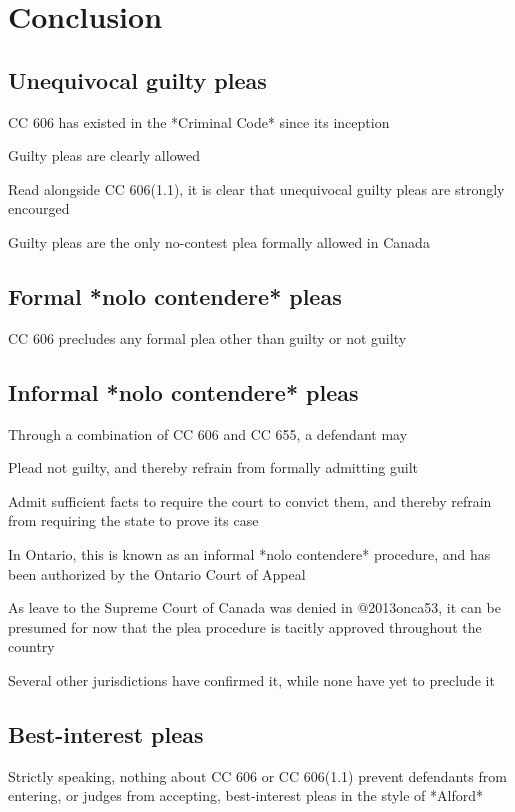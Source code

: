 \section{Conclusion}

\subsection{Unequivocal guilty pleas}

CC 606 has existed in the *Criminal Code* since its inception

Guilty pleas are clearly allowed

Read alongside CC 606(1.1), it is clear that unequivocal guilty pleas are strongly encourged

Guilty pleas are the only no-contest plea formally allowed in Canada

\subsection{Formal *nolo contendere* pleas}

CC 606 precludes any formal plea other than guilty or not guilty

\subsection{Informal *nolo contendere* pleas}
Through a combination of CC 606 and CC 655, a defendant may

Plead not guilty, and thereby refrain from formally admitting guilt

Admit sufficient facts to require the court to convict them, and thereby refrain from requiring the state to prove its case

In Ontario, this is known as an informal *nolo contendere* procedure, and has been authorized by the Ontario Court of Appeal

As leave to the Supreme Court of Canada was denied in @2013onca53, it can be presumed for now that the plea procedure is tacitly approved throughout the country

Several other jurisdictions have confirmed it, while none have yet to preclude it

\subsection{Best-interest pleas}

Strictly speaking, nothing about CC 606 or CC 606(1.1) prevent defendants from entering, or judges from accepting, best-interest pleas in the style of *Alford*

